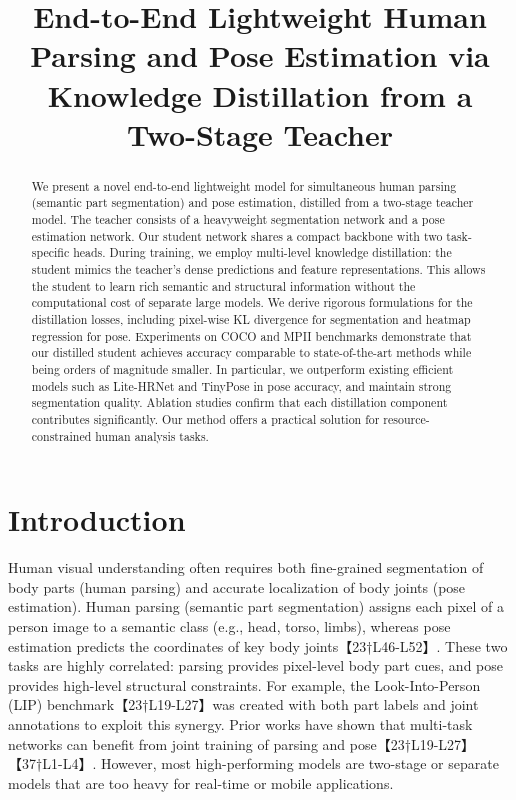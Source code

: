 \documentclass{article}
\begin{document}
\title{End-to-End Lightweight Human Parsing and Pose Estimation via Knowledge Distillation from a Two-Stage Teacher}
\maketitle

\begin{abstract}
We present a novel end-to-end lightweight model for simultaneous human parsing (semantic part segmentation) and pose estimation, distilled from a two-stage teacher model. The teacher consists of a heavyweight segmentation network and a pose estimation network. Our student network shares a compact backbone with two task-specific heads. During training, we employ multi-level knowledge distillation: the student mimics the teacher’s dense predictions and feature representations. This allows the student to learn rich semantic and structural information without the computational cost of separate large models. We derive rigorous formulations for the distillation losses, including pixel-wise KL divergence for segmentation and heatmap regression for pose. Experiments on COCO and MPII benchmarks demonstrate that our distilled student achieves accuracy comparable to state-of-the-art methods while being orders of magnitude smaller. In particular, we outperform existing efficient models such as Lite-HRNet and TinyPose in pose accuracy, and maintain strong segmentation quality. Ablation studies confirm that each distillation component contributes significantly. Our method offers a practical solution for resource-constrained human analysis tasks.
\end{abstract}

\section{Introduction}
Human visual understanding often requires both fine-grained segmentation of body parts (human parsing) and accurate localization of body joints (pose estimation). Human parsing (semantic part segmentation) assigns each pixel of a person image to a semantic class (e.g., head, torso, limbs), whereas pose estimation predicts the coordinates of key body joints【23†L46-L52】. These two tasks are highly correlated: parsing provides pixel-level body part cues, and pose provides high-level structural constraints. For example, the Look-Into-Person (LIP) benchmark【23†L19-L27】was created with both part labels and joint annotations to exploit this synergy. Prior works have shown that multi-task networks can benefit from joint training of parsing and pose【23†L19-L27】【37†L1-L4】. However, most high-performing models are two-stage or separate models that are too heavy for real-time or mobile applications.
\end{document}
